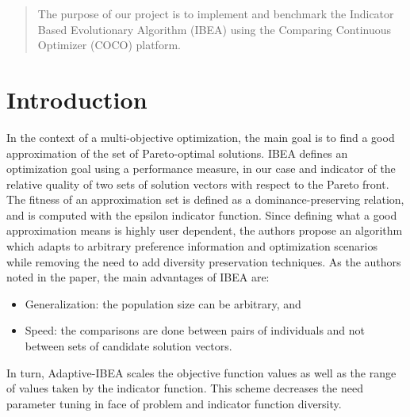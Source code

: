 \documentclass{sig-alternate}
\begin{document}
\maketitle
\begin{abstract}
The purpose of our project is to implement and benchmark the Indicator Based Evolutionary Algorithm (IBEA) using  the Comparing Continuous Optimizer (COCO) platform.

\end{abstract}




\section{Introduction}
In the context of a multi-objective optimization, the main goal is to find a good approximation of the set of Pareto-optimal solutions. IBEA defines an optimization goal using a performance measure, in our case and indicator of the relative quality of two sets of solution vectors with respect to the Pareto front. The fitness of an approximation set is defined as a dominance-preserving relation, and is computed with the epsilon indicator function. Since defining what a good approximation means is highly user dependent, the authors propose an algorithm which adapts to arbitrary preference information and optimization scenarios while removing the need to add diversity preservation techniques. As the authors noted in the paper, the main advantages of IBEA are:
\begin{itemize}
\item Generalization: the population size can be arbitrary, and
\item Speed: the comparisons are done between pairs of individuals and not between sets of candidate solution vectors.
\end{itemize}

In turn, Adaptive-IBEA scales the objective function values as well as the range of values taken by the indicator function. This scheme decreases the need parameter tuning in face of problem and indicator function diversity.
\end{document}
